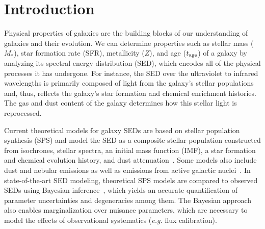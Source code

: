 \section{Introduction} \label{sec:intro} 
Physical properties of galaxies are the building
blocks of our understanding of galaxies and their evolution. 
We can determine properties such as stellar mass ($M_*$), star formation rate (SFR), metallicity
($Z$), and age ($t_{\rm age}$) of a galaxy by analyzing its
spectral energy distribution (SED), which encodes all of the physical
processes it has undergone. 
For instance, the SED over the ultraviolet to infrared wavelengths is primarily
composed of light from the galaxy's stellar populations and, thus, reflects the
galaxy's star formation and chemical enrichment histories.  
The gas and dust content of the galaxy determines how this stellar light is
reprocessed.  

Current theoretical models for galaxy SEDs are based on stellar population
synthesis (SPS) and model the SED as a composite stellar population constructed
from isochrones, stellar spectra, an initial mass function (IMF), a star
formation and chemical evolution history, and dust
attenuation~\citep[\emph{e.g.}][see \citealt{walcher2011, conroy2013} for a
comprehensive review]{bruzual2003, maraston2005, conroy2009}.
Some models also include dust and nebular emissions as well as emissions from
active galactic nuclei~\citep[\emph{e.g.}][]{johnson2021}.
In state-of-the-art SED modeling, theoretical SPS models are compared to
observed SEDs using Bayesian inference~\citep{acquaviva2011, chevallard2016,
leja2017, carnall2018, johnson2021, hahn2022}, which yields 
an accurate quantification of parameter uncertainties and degeneracies among them. 
The Bayesian approach also enables marginalization over nuisance parameters,
which are necessary to model the effects of observational systematics
(\emph{e.g.} flux calibration).

